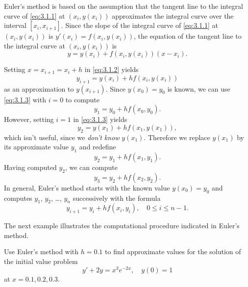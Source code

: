 Euler's method is based on the assumption that the tangent line to the integral curve of
\eqref{eq:3.1.1} at $(x_{i},y(x_{i}))$ approximates the integral curve over the interval
$[x_{i},x_{i+1}]$. Since the slope of the integral curve of \eqref{eq:3.1.1} at $(x_{i},y(x_{i}))$
is $y'(x_{i})=f(x_{i},y(x_{i}))$, the equation of the tangent line to the integral curve at
$(x_{i},y(x_{i}))$ is
\begin{equation}
  \label{eq:3.1.2}y=y(x_{i})+f(x_{i},y(x_{i}))(x-x_{i}).
\end{equation}

Setting $x=x_{i+1}=x_{i}+h$ in \eqref{eq:3.1.2} yields
\begin{equation}
  \label{eq:3.1.3}y_{i+1}=y(x_{i})+hf(x_{i},y(x_{i}))
\end{equation}
as an approximation to $y(x_{i+1})$. Since $y(x_{0})=y_{0}$ is known, we can use \eqref{eq:3.1.3}
with $i=0$ to compute
\[
  y_{1}=y_{0}+hf(x_{0},y_{0}).
\]
However, setting $i=1$ in \eqref{eq:3.1.3} yields
\[
  y_{2}=y(x_{1})+hf(x_{1},y(x_{1})),
\]
which isn't useful, since we {\color{blue}\it don't know\/} $y(x_{1})$. Therefore we replace
$y(x_{1})$ by its approximate value $y_{1}$ and redefine
\[
  y_{2}=y_{1}+hf(x_{1},y_{1}).
\]
Having computed $y_{2}$, we can compute
\[
  y_{3}=y_{2}+hf(x_{2},y_{2}).
\]
In general, Euler's method starts with the known value $y(x_{0})=y_{0}$ and computes $y_{1}$,
$y_{2}$, \dots, $y_{n}$ successively with the formula
\begin{equation}
  \label{eq:3.1.4}y_{i+1}=y_{i}+hf(x_{i},y_{i}),\quad0\le i\le n-1.
\end{equation}

The next example illustrates the computational procedure indicated in Euler's method.

\begin{example}
  \label{example:3.1.1} \rm Use Euler's method with $h=0.1$ to find approximate values for the
  solution of the initial value problem
  \begin{equation}
    \label{eq:3.1.5}y'+2y=x^{3}e^{-2x},\quad y(0)=1
  \end{equation}
  at $x=0.1,0.2,0.3$.
\end{example}

